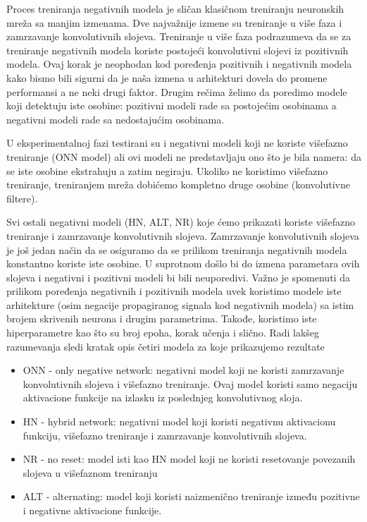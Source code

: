 Proces treniranja negativnih modela je sličan klasičnom treniranju neuronskih mreža sa manjim izmenama. Dve najvažnije izmene su treniranje u više faza i zamrzavanje konvolutivnih slojeva. Treniranje u više faza podrazumeva da se za treniranje negativnih modela koriste postojeći konvolutivni slojevi iz pozitivnih modela. Ovaj korak je neophodan kod poređenja pozitivnih i negativnih modela kako bismo bili sigurni da je naša izmena u arhitekturi dovela do promene performansi a ne neki drugi faktor. Drugim rečima želimo da poredimo modele koji detektuju iste osobine: pozitivni modeli rade sa postojećim osobinama a negativni modeli rade sa nedostajućim osobinama.

U eksperimentalnoj fazi testirani su i negativni modeli koji ne koriste višefazno treniranje (ONN model) ali ovi modeli ne predstavljaju ono što je bila namera: da se iste osobine ekstrahuju a zatim negiraju. Ukoliko ne koristimo višefazno treniranje, treniranjem mreža dobićemo kompletno druge osobine (konvolutivne filtere).

Svi ostali negativni modeli (HN, ALT, NR) koje ćemo prikazati koriste višefazno treniranje i zamrzavanje konvolutivnih slojeva. Zamrzavanje konvolutivnih slojeva je još jedan način da se osiguramo da se prilikom treniranja negativnih modela konstantno koriste iste osobine. U suprotnom došlo bi do izmena parametara ovih slojeva i negativni i pozitivni modeli bi bili neuporedivi. Važno je spomenuti da prilikom poređenja negativnih i pozitivnih modela uvek koristimo modele iste arhitekture (osim negacije propagiranog signala kod negativnih modela) sa istim brojem skrivenih neurona i drugim parametrima. Takođe, koristimo iste hiperparametre kao što su broj epoha, korak učenja i slično. Radi lakšeg razumevanja sledi kratak opis četiri modela za koje prikazujemo rezultate

\begin{itemize}
    \item ONN - only negative network: negativni model koji ne koristi zamrzavanje konvolutivnih slojeva i višefazno treniranje. Ovaj model koristi samo negaciju aktivacione funkcije na izlasku iz poslednjeg konvolutivnog sloja.
    \item HN - hybrid network: negativni model koji koristi negativnu aktivacionu funkciju, višefazno treniranje i zamrzavanje konvolutivnih slojeva.
    \item NR - no reset: model isti kao HN model koji ne koristi resetovanje povezanih slojeva u višefaznom treniranju
    \item ALT - alternating: model koji koristi naizmenično treniranje između pozitivne i negativne aktivacione funkcije.
\end{itemize}

